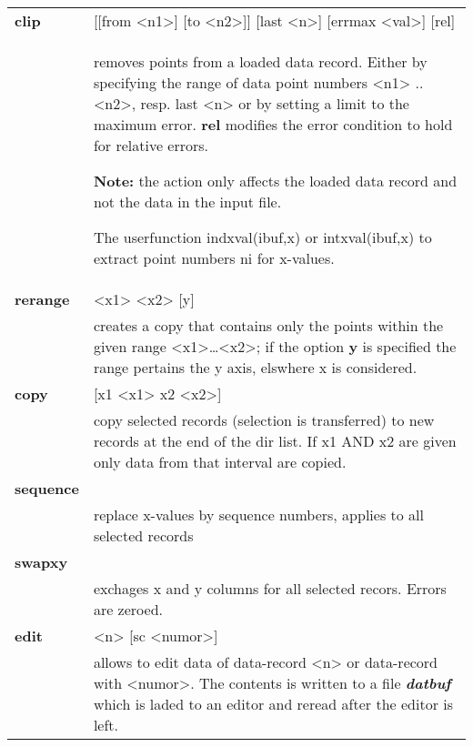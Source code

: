 \documentclass[]{article}
\begin{document}
\begin{longtable}[]{@{}ll@{}}
\toprule
\endhead
\textbf{clip} & {[}{[}from \textless{}n1\textgreater{}{]} {[}to
\textless{}n2\textgreater{}{]}{]} {[}last \textless{}n\textgreater{}{]}
{[}errmax \textless{}val\textgreater{}{]} {[}rel{]}\tabularnewline
\begin{minipage}[t]{0.47\columnwidth}\raggedright
\strut
\end{minipage} & \begin{minipage}[t]{0.47\columnwidth}\raggedright
removes points from a loaded data record. Either by specifying the range
of data point numbers \textless{}n1\textgreater{}
..\textless{}n2\textgreater{}, resp. last \textless{}n\textgreater{} or
by setting a limit to the maximum error. \textbf{rel} modifies the error
condition to hold for relative errors.

\textbf{Note:} the action only affects the loaded data record and not
the data in the input file.

The userfunction indxval(ibuf,x) or intxval(ibuf,x) to extract point
numbers ni for x-values.\strut
\end{minipage}\tabularnewline
\textbf{rerange} & \textless{}x1\textgreater{}
\textless{}x2\textgreater{} {[}y{]}\tabularnewline
& creates a copy that contains only the points within the given range
\textless{}x1\textgreater{}\ldots{}\textless{}x2\textgreater{}; if the
option \textbf{y} is specified the range pertains the y axis, elswhere x
is considered.\tabularnewline
\textbf{copy} & {[}x1 \textless{}x1\textgreater{} x2
\textless{}x2\textgreater{}{]}\tabularnewline
& copy selected records (selection is transferred) to new records at the
end of the dir list. If x1 AND x2 are given only data from that interval
are copied.\tabularnewline
\textbf{sequence} &\tabularnewline
& replace x-values by sequence numbers, applies to all selected records
\tabularnewline
\textbf{swapxy} &\tabularnewline
& exchages x and y columns for all selected recors. Errors are
zeroed.\tabularnewline
\textbf{edit} & \textless{}n\textgreater{} {[}sc
\textless{}numor\textgreater{}{]}\tabularnewline
\begin{minipage}[t]{0.47\columnwidth}\raggedright
\strut
\end{minipage} & \begin{minipage}[t]{0.47\columnwidth}\raggedright
allows to edit data of data-record \textless{}n\textgreater{} or
data-record with \textless{}numor\textgreater{}. The contents is written
to a file \emph{\textbf{datbuf}} which is laded to an editor and reread
after the editor is left.


\end{minipage}
\end{longtable}
\end{document}
